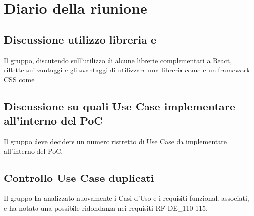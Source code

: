 \section{Diario della riunione}
\subsection{Discussione utilizzo libreria  e }
Il gruppo, discutendo sull'utilizzo di alcune librerie complementari a React, riflette sui vantaggi e gli svantaggi di utilizzare una libreria come  e un framework CSS come 
\subsection{Discussione su quali Use Case implementare all'interno del PoC}
Il gruppo deve decidere un numero ristretto di Use Case da implementare all'interno del PoC.
\subsection{Controllo Use Case duplicati}
Il gruppo ha analizzato nuovamente i Casi d'Uso e i requisiti funzionali associati, e ha notato una possibile ridondanza nei requisiti RF-DE\_110-115.
